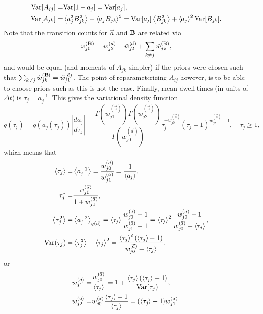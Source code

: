 \begin{align}
\text{Var}[A_{jj}]=&\text{Var}[1-a_j]=\text{Var}[a_j],\nonumber\\
\text{Var}[A_{jk}]=&\left\langle a_j^2B_{jk}^2\right\rangle-\left\langle a_jB_{jk}\right\rangle^2
        =\text{Var}[a_j]\left\langle B_{jk}^2\right\rangle+\left\langle a_j\right\rangle^2\text{Var}[B_{jk}].\label{Avar}
\end{align}
Note that the transition counts
for $\vec a$ and $\mathbf{B}$ are related via
\begin{equation}
w_{j0}^{(\mathbf{B})}=w_{j2}^{(\vec{a})}-\tilde w_{j2}^{(\vec{a})}+\sum_{k\ne j}\tilde w_{jk}^{(\mathbf{B})},
\end{equation}
and would be equal (and moments of $A_{jk}$ simpler) if the priors
were chosen such that $\sum_{k\ne j}\tilde
w_{jk}^{(\mathbf{B})}=\tilde w_{j1}^{(\vec{a})}$. The point of
reparameterizing $A_{ij}$ however, is to be able to choose priors such
as this is not the case. Finally, mean dwell times (in units of
$\Delta t$) is $\tau_j=a_j^{-1}$. This gives the variational density
function
\begin{equation}
q(\tau_j)=q(a_j(\tau_j))\left|\frac{da_j}{d\tau_j}\right|
=\frac{\Gamma(w_{j1}^{(\vec{a})})\Gamma(w_{j2}^{(\vec{a})})}{\Gamma(w_{j0}^{(\vec{a})})}
\tau_j^{-w_{j0}^{(\vec{a})}}(\tau_j-1)^{w_{j2}^{(\vec{a})}-1},
\quad \tau_j\ge 1,
\end{equation}
which means that
\begin{align}
\left\langle \tau_j\right\rangle=&\left\langle a_j^{-1}\right\rangle=
\frac{w_{j0}^{(\vec{a})}}{w_{j1}^{(\vec{a})}}=\frac{1}{\left\langle a_j\right\rangle},\label{eq:dwellmean}\\
\tau_j^*=&\frac{w_{j0}^{(\vec{a})}}{1+w_{j1}^{(\vec{a})}},\label{eq:dwellmode}\\
\left\langle \tau_j^2\right\rangle=&\left\langle a_j^{-2}\right\rangle_{q(\vec{a})}=
\left\langle \tau_j\right\rangle\frac{w_{j0}^{(\vec{a})}-1}{w_{j1}^{(\vec{a})}-1}
=\left\langle \tau_j\right\rangle^2\frac{w_{j0}^{(\vec{a})}-1}{w_{j0}^{(\vec{a})}-\left\langle \tau_j\right\rangle},\\
\text{Var}(\tau_j)=&
\left\langle \tau_j^2\right\rangle-\left\langle \tau_j\right\rangle^2=
\frac{\left\langle \tau_j\right\rangle^2(\left\langle \tau_j\right\rangle-1)}{w_{j0}^{(\vec{a})}-\left\langle \tau_j\right\rangle}.
\end{align}
or
\begin{align}
w_{j1}^{(\vec{a})}=&\frac{w_{j0}^{(\vec{a})}}{\left\langle \tau_j\right\rangle}
=1+\frac{\left\langle \tau_j\right\rangle(\left\langle \tau_j\right\rangle-1)}{\text{Var}(\tau_j)},\nonumber\\
w_{j2}^{(\vec{a})}=&w_{j0}^{(\vec{a})}\frac{\left\langle \tau_j\right\rangle-1}{\left\langle \tau_j\right\rangle}
=(\left\langle \tau_j\right\rangle-1)w_{j1}^{(\vec{a})}.\label{eq:wjka}
\end{align}




